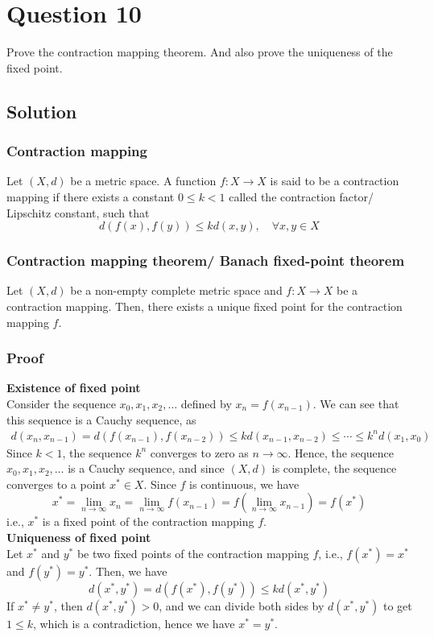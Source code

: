 \section*{Question 10}

Prove the contraction mapping theorem.
And also prove the uniqueness of the fixed point.

\subsection*{Solution}

\subsubsection*{Contraction mapping}

Let \( (X, d) \) be a metric space.
A function \( f: X \to X \) is said to be a contraction mapping if there exists a constant \( 0 \leq k < 1 \) called the contraction factor/ Lipschitz constant, such that
\[
    d(f(x), f(y)) \leq k d(x, y), \quad \forall x, y \in X
\]

\subsubsection*{Contraction mapping theorem/ Banach fixed-point theorem}

Let \( (X, d) \) be a non-empty complete metric space and \( f: X \to X \) be a contraction mapping.
Then, there exists a unique fixed point for the contraction mapping \( f \).

\subsubsection*{Proof}

\textbf{Existence of fixed point}\\
Consider the sequence \( x_0, x_1, x_2, \dots \) defined by \( x_{n} = f(x_{n-1}) \).
We can see that this sequence is a Cauchy sequence, as
\begin{align*}
    d(x_{n}, x_{n-1}) = d(f(x_{n-1}), f(x_{n-2})) \leq k d(x_{n-1}, x_{n-2}) \leq \cdots \leq k^{n} d(x_1, x_0)
\end{align*}
Since \( k < 1 \), the sequence \( k^n \) converges to zero as \( n \to \infty \).
Hence, the sequence \( x_0, x_1, x_2, \dots \) is a Cauchy sequence, and since \( (X, d) \) is complete, the sequence converges to a point \( x^* \in X \).
Since \( f \) is continuous, we have
\[
    x^* = \lim_{n \to \infty} x_n = \lim_{n \to \infty} f(x_{n-1}) = f \left( \lim_{n \to \infty} x_{n-1} \right) = f(x^*)
\]
i.e., \( x^* \) is a fixed point of the contraction mapping \( f \).
\vspace*{1em}\\
\textbf{Uniqueness of fixed point}\\
Let \( x^* \) and \( y^* \) be two fixed points of the contraction mapping \( f \), i.e., \( f(x^*) = x^* \) and \( f(y^*) = y^* \).
Then, we have
\[
    d(x^*, y^*) = d(f(x^*), f(y^*)) \leq k d(x^*, y^*)
\]
If \( x^* \neq y^* \), then \( d(x^*, y^*) > 0 \), and we can divide both sides by \( d(x^*, y^*) \) to get \( 1 \leq k \), which is a contradiction, hence we have \( x^* = y^* \).
